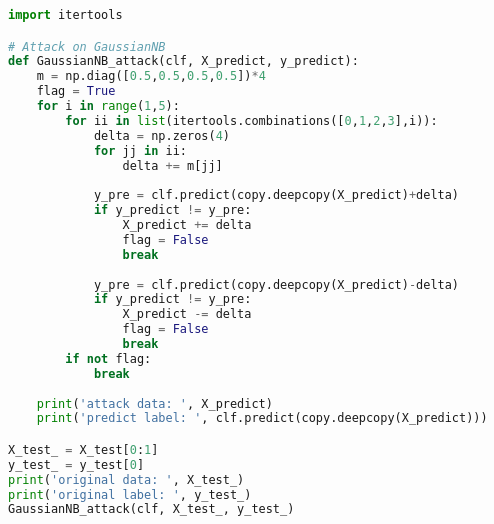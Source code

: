 \begin{lstlisting}[language=Python]
import itertools

# Attack on GaussianNB
def GaussianNB_attack(clf, X_predict, y_predict): 
    m = np.diag([0.5,0.5,0.5,0.5])*4
    flag = True
    for i in range(1,5):
        for ii in list(itertools.combinations([0,1,2,3],i)):
            delta = np.zeros(4)
            for jj in ii:
                delta += m[jj]
            
            y_pre = clf.predict(copy.deepcopy(X_predict)+delta)      
            if y_predict != y_pre:
                X_predict += delta
                flag = False
                break
                
            y_pre = clf.predict(copy.deepcopy(X_predict)-delta)      
            if y_predict != y_pre:
                X_predict -= delta
                flag = False
                break
        if not flag:
            break
    
    print('attack data: ', X_predict)
    print('predict label: ', clf.predict(copy.deepcopy(X_predict)))

X_test_ = X_test[0:1]
y_test_ = y_test[0]
print('original data: ', X_test_)
print('original label: ', y_test_)
GaussianNB_attack(clf, X_test_, y_test_)
\end{lstlisting}